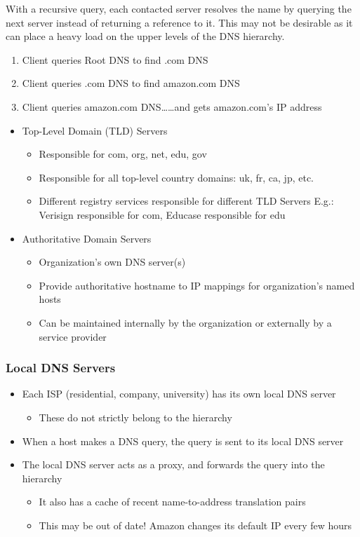 With a recursive query, each contacted server resolves the name by querying the next server instead of returning a reference to it.
This may not be desirable as it can place a heavy load on the upper levels of the DNS hierarchy.
\begin {enumerate}
  \item Client queries Root DNS to find .com DNS
  \item Client queries .com DNS to find amazon.com DNS
  \item Client queries amazon.com DNS……and gets amazon.com’s IP address
\end {enumerate}
\begin {itemize}
  \item Top-Level Domain (TLD) Servers
    \begin{itemize}
      \item Responsible for com, org, net, edu, gov
      \item Responsible for all top-level country domains: uk, fr, ca, jp, etc.
      \item Different registry services responsible for different TLD Servers
        E.g.: Verisign responsible for com, Educase responsible for edu
    \end{itemize}
  \item Authoritative Domain Servers
    \begin{itemize}
      \item Organization’s own DNS server(s)
      \item Provide authoritative hostname to IP mappings for organization’s named hosts
      \item Can be maintained internally by the organization or externally by a service provider
    \end{itemize}
\end {itemize}
\subsubsection{Local DNS Servers}
\begin{itemize}
  \item Each ISP (residential, company, university) has its own local DNS server
    \begin{itemize}
      \item These do not strictly belong to the hierarchy
    \end{itemize}
  \item When a host makes a DNS query, the query is sent to its local DNS server
  \item The local DNS server acts as a proxy, and forwards the query into the hierarchy
    \begin{itemize}
      \item It also has a cache of recent name-to-address translation pairs
      \item This may be out of date! Amazon changes its default IP every few hours
    \end{itemize}
\end{itemize}

